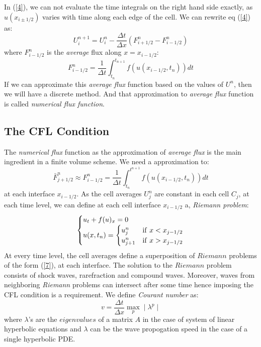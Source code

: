 In (\ref{4}), we can not evaluate the time integrals on the right hand side exactly, as $u(x_{i\pm1/2})$ varies with time along each edge of the cell. We can rewrite eq (\ref{4}) as:
\begin{equation}
U_i^{n+1} = U_i^n - \frac{\Delta t}{\Delta x} \left(F_{i+1/2}^n - F_{i-1/2}^n \right)
\end{equation}
where $F_{i-1/2}^n $ is the \textit{average} flux along $ x = x_{i-1/2}$:
\begin{equation*}
F_{i-1/2}^n  =  \frac{1}{\Delta t} \int_{t_n}^{t_{n+1}} f(u(x_{i-1/2},t_n)) dt
\end{equation*}
If we can approximate this \textit{average flux} function based on the values of $U^n$, then we will have a discrete method. And that approximation to \textit{average flux}  function is called \textit{numerical flux function}.

\subsection{The CFL Condition} \label{cfl}
The \textit{numerical flux} function as the approximation of \textit{average flux} is the main ingredient in a finite volume scheme. We need a approximation to:
\begin{equation}
\bar{F}^n_{j+1/2} \approx F^n_{i-1/2} =  \frac{1}{\Delta t}\int_{t_n}^{t^{n+1}} f(u(x_{i-1/2}, t_n)) dt
\end{equation}
at each interface $x_{i-1/2}$. As the cell averages $U^n_j$ are constant in each cell $C_j$, at each time level, we can define at each cell interface $x_{i-1/2}$ a, \textit{Riemann problem}:
\begin{equation} \label{7}
\begin{cases}
u_t + f(u)_x = 0 \\
u(x, t_n) = & \hspace{-28pt}
\begin{cases}
u^n_j  &  \text{if} \hspace{4pt} x < x_{j-1/2} \\
u^n_{j+1} & \text{if} \hspace{4pt} x > x_{j-1/2}
\end{cases}
\end{cases}
\end{equation}
At every time level, the cell averages define a superposition of $Riemann$ problems of the form (\ref{7}), at each interface. The solution to the $Riemann$ problem consists of shock waves, rarefraction and compound waves. Moreover, waves from neighboring \textit{Riemann} problems can intersect after some time hence imposing the CFL condition is a requirement. We define \textit{Courant number} as:
\begin{equation} \label{8}
v = \frac{\Delta t}{\Delta x} \max_p\mid\lambda^p\mid
\end{equation}
where $\lambda$'s are the $eigenvalues$ of a matrix $A$ in the case of system of linear hyperbolic equations and $\lambda$ can be the wave propogation speed in the case of a single hyperbolic PDE.

